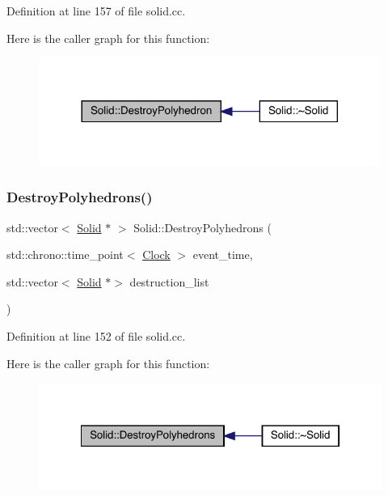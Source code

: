Definition at line 157 of file solid.\+cc.

Here is the caller graph for this function\+:
\nopagebreak
\begin{figure}[H]
\begin{center}
\leavevmode
\includegraphics[width=317pt]{class_solid_a0841900d8ef4b82292ac027c4852b59b_icgraph}
\end{center}
\end{figure}
\mbox{\label{class_solid_ab1652ee511ed51bbe6a0a3b1854b7974}} 
\subsubsection{\texorpdfstring{Destroy\+Polyhedrons()}{DestroyPolyhedrons()}}
{\footnotesize\ttfamily std\+::vector$<$ \hyperlink{class_solid}{Solid} $\ast$ $>$ Solid\+::\+Destroy\+Polyhedrons (\begin{DoxyParamCaption}\item[{std\+::chrono\+::time\+\_\+point$<$ \hyperlink{universe_8h_a0ef8d951d1ca5ab3cfaf7ab4c7a6fd80}{Clock} $>$}]{event\+\_\+time,  }\item[{std\+::vector$<$ \hyperlink{class_solid}{Solid} $\ast$$>$}]{destruction\+\_\+list }\end{DoxyParamCaption})}



Definition at line 152 of file solid.\+cc.

Here is the caller graph for this function\+:
\nopagebreak
\begin{figure}[H]
\begin{center}
\leavevmode
\includegraphics[width=322pt]{class_solid_ab1652ee511ed51bbe6a0a3b1854b7974_icgraph}
\end{center}
\end{figure}
\mbox{\label{class_solid_a7ca41431033d05957f8be3f49c3aca23}} 
